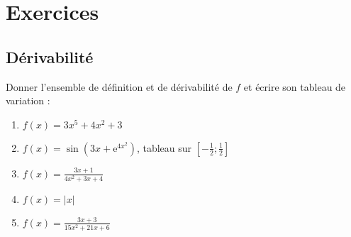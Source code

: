 \documentclass[11pt]{article}
\newcommand{\e}[1]{\mathrm{e}^{#1}}
\begin{document}
    \section{Exercices}

        \subsection{Dérivabilité}
        
        \begin{Exercise}
            
            Donner l'ensemble de définition et de dérivabilité de $f$ et écrire son tableau de variation :
            \begin{enumerate}
                \item $f(x)=3x^5+4x^2+3$
                \item $f(x)=\sin(3x +\e{4x^2})$, tableau sur $[-\frac{1}{2}; \frac{1}{2}]$
                \item $f(x)=\frac{3x+1}{4x^2+3x+4}$
                \item $f(x)=|x|$
                \item $f(x)=\frac{3x+3}{15x^2+21x+6}$
            \end{enumerate}

        \end{Exercise}
\end{document}
